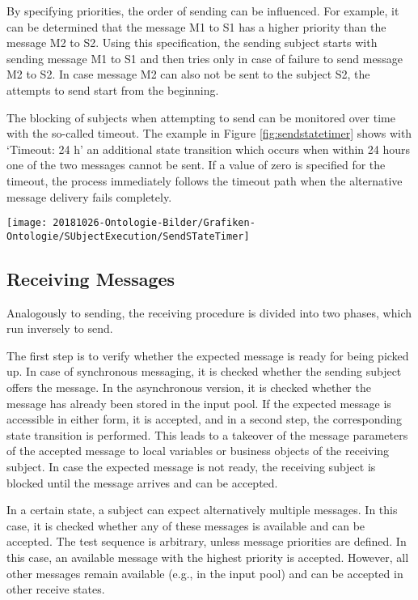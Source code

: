 By specifying priorities, the order of sending can be influenced. For example, it can be determined that the message M1 to S1 has a higher priority than the message M2 to S2. Using this specification, the sending subject starts with sending message M1 to S1 and then tries only in case of failure to send message M2 to S2. In case message M2 can also not be sent to the subject S2, the attempts to send start from the beginning.

The blocking of subjects when attempting to send can be monitored over time with the so-called timeout. The example in Figure \ref{fig:sendstatetimer} shows with ‘Timeout: 24 h’ an additional state transition which occurs when within 24 hours one of the two messages cannot be sent. If a value of zero is specified for the timeout, the process immediately follows the timeout path when the alternative message delivery fails completely.

\begin{figure*}[ph]
	\centering
	\texttt{[image: 20181026-Ontologie-Bilder/Grafiken-Ontologie/SUbjectExecution/SendSTateTimer]}
	\caption[Send using time monitoring]{Send using time monitoring}
	\label{fig:sendstatetimer}
\end{figure*}


\subsection{Receiving Messages}
Analogously to sending, the receiving procedure is divided into two phases, which run inversely to send.

The first step is to verify whether the expected message is ready for being picked up. In case of synchronous messaging, it is checked whether the sending subject offers the message. In the asynchronous version, it is checked whether the message has already been stored in the input pool. If the expected message is accessible in either form, it is accepted, and in a second step, the corresponding state transition is performed. This leads to a takeover of the message parameters of the accepted message to local variables or business objects of the receiving subject. In case the expected message is not ready, the receiving subject is blocked until the message arrives and can be accepted.

In a certain state, a subject can expect alternatively multiple messages. In this case, it is checked whether any of these messages is available and can be accepted. The test sequence is arbitrary, unless message priorities are defined. In this case, an available message with the highest priority is accepted. However, all other messages remain available (e.g., in the input pool) and can be accepted in other receive states.

